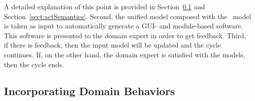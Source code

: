 A detailed explanation of this point is provided in Section~\ref{subsect:domainBehaviors} and Section~\ref{sect:actSemantics}. %
%
%
%
Second, the unified model composed with the \agl~model is taken as input to automatically generate a GUI- and module-based software. This software is presented to the domain expert in order to get feedback. %
%
Third, if there is feedback, then the input model will be updated and the cycle continues. If, on the other hand, the domain expert is satisfied with the models, then the cycle ends.

\subsection{Incorporating Domain Behaviors} 
\label{subsect:domainBehaviors}

